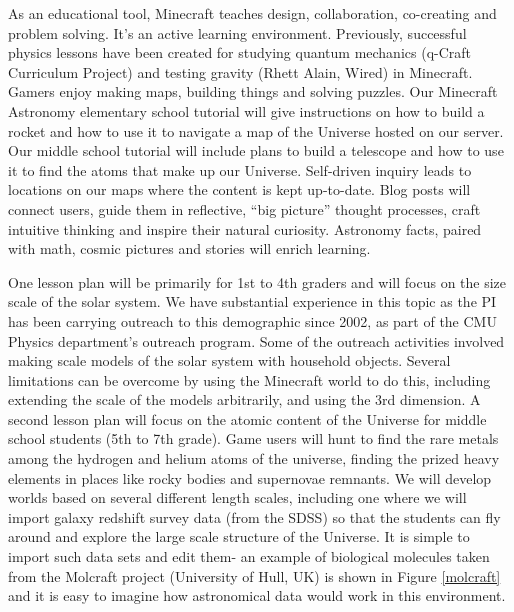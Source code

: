 As an educational tool, Minecraft teaches design, collaboration,
co-creating and problem solving. It’s an active learning
environment. Previously, successful physics lessons have been created
for studying quantum mechanics (q-Craft Curriculum Project) and
testing gravity (Rhett Alain, Wired) in Minecraft. Gamers enjoy making
maps, building things and solving puzzles.  Our Minecraft Astronomy
elementary school tutorial will give instructions on how to build a
rocket and how to use it to navigate a map of the Universe hosted on
our server. Our middle school tutorial will include plans to build a
telescope and how to use it to find the atoms that make up our
Universe. Self-driven inquiry leads to locations on our maps where the
content is kept up-to-date.  Blog posts will connect users, guide them
in reflective, “big picture” thought processes, craft intuitive
thinking and inspire their natural curiosity.  Astronomy facts, paired
with math, cosmic pictures and stories will enrich learning.
 
One lesson plan will be primarily for 1st to 4th graders and will
focus on the size scale of the solar system.  We have substantial
experience in this topic as the PI has been carrying outreach to this
demographic since 2002, as part of the CMU Physics department's
outreach program. Some of the outreach activities involved making
scale models of the solar system with household objects.  Several
limitations can be overcome by using the Minecraft world to do this,
including extending the scale of the models arbitrarily, and using the
3rd dimension.  A second lesson plan will focus on the atomic content
of the Universe for middle school students (5th to 7th grade). Game
users will hunt to find the rare metals among the hydrogen and helium
atoms of the universe, finding the prized heavy elements in places
like rocky bodies and supernovae remnants.  We will develop worlds
based on several different length scales, including one where we will
import galaxy redshift survey data (from the SDSS) so that the
students can fly around and explore the large scale structure of the
Universe.  It is simple to import such data sets and edit them- an
example of biological molecules taken from the Molcraft project
(University of Hull, UK) is shown in Figure \ref{molcraft} and it is
easy to imagine how astronomical data would work in this environment.



